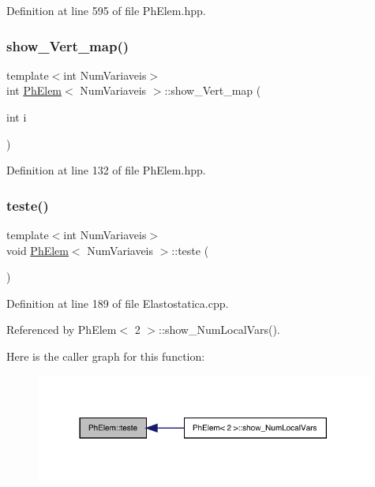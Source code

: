 Definition at line 595 of file Ph\+Elem.\+hpp.

\mbox{\label{classPhElem_ace7e4ec0fa3ca3e829cd790375ab981e}} 
\subsubsection{\texorpdfstring{show\+\_\+\+Vert\+\_\+map()}{show\_Vert\_map()}}
{\footnotesize\ttfamily template$<$int Num\+Variaveis$>$ \\
int \hyperlink{classPhElem}{Ph\+Elem}$<$ Num\+Variaveis $>$\+::show\+\_\+\+Vert\+\_\+map (\begin{DoxyParamCaption}\item[{int}]{i }\end{DoxyParamCaption})\hspace{0.3cm}{\ttfamily [inline]}}



Definition at line 132 of file Ph\+Elem.\+hpp.

\mbox{\label{classPhElem_a9742fa2313cf25a24ae9c5602bd75ac0}} 
\subsubsection{\texorpdfstring{teste()}{teste()}}
{\footnotesize\ttfamily template$<$int Num\+Variaveis$>$ \\
void \hyperlink{classPhElem}{Ph\+Elem}$<$ Num\+Variaveis $>$\+::teste (\begin{DoxyParamCaption}{ }\end{DoxyParamCaption})}



Definition at line 189 of file Elastostatica.\+cpp.



Referenced by Ph\+Elem$<$ 2 $>$\+::show\+\_\+\+Num\+Local\+Vars().

Here is the caller graph for this function\+:
\nopagebreak
\begin{figure}[H]
\begin{center}
\leavevmode
\includegraphics[width=314pt]{classPhElem_a9742fa2313cf25a24ae9c5602bd75ac0_icgraph}
\end{center}
\end{figure}
\mbox{\label{classPhElem_adc3411d8b3a88f04004b6d48e64e9334}} 
